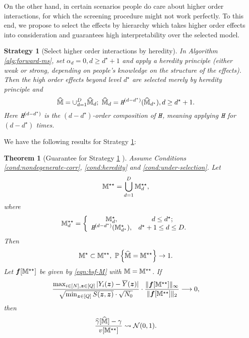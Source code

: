 \documentclass[12pt]{article}
\newtheorem{theorem}{Theorem}
\newtheorem{strategy}{Strategy}
\begin{document}
On the other hand, in certain scenarios people do care about higher order interactions, for which the screening procedure might not  work perfectly. To this end, we propose to select the effects by hierarchy which takes higher order effects into consideration and guarantees high interpretability over the selected model. 


\begin{strategy}[Select higher order interactions by heredity]\label{str:select-by-heredity}
In Algorithm \ref{alg:forward-ms}, set $\alpha_d = 0,d\ge d^\star+1$ and apply a heredity principle (either weak or strong, depending on people's knowledge on the structure of the effects). Then the high order effects beyond level $ d^\star$ are selected merely by heredity principle and 
$$
\widehat{{\mathbb{M}}} = \cup_{d=1}^{D}\widehat{{\mathbb{M}}}_{d}; ~\widehat{{\mathbb{M}}}_{d} = \texttt{\em H}^{(d-d^\star)}(\widehat{{\mathbb{M}}}_{d^\star}), d\ge d^\star+1.
$$
Here $\texttt{\em H}^{(d-d^\star)}$ is the $(d-d^\star)$-order composition of $\texttt{\em H}$, meaning applying $\texttt{\em H}$ for $(d-d^\star)$ times.
\end{strategy}


We have the following results for Strategy \ref{str:select-by-heredity}:
\begin{theorem}[Guarantee for Strategy \ref{str:select-by-heredity} ]\label{thm:strategy-II}
Assume Conditions \ref{cond:nondegenerate-corr}, \ref{cond:heredity} and \ref{cond:under-selection}. Let 
\begin{align*}
    {\mathbb{M}}^{\star\star} = \bigcup_{d=1}^D {\mathbb{M}}^{\star\star}_d,
\end{align*}
where
\begin{align*}
    {\mathbb{M}}^{\star\star}_d = \left\{
    \begin{array}{cc}
        {\mathbb{M}}^{\star}_d, & d\le d^\star; \\
        \texttt{\em H}^{(d-d^\star)}({\mathbb{M}}^{\star}_{d^\star}), & d^\star+1\le d\le D.
    \end{array}
    \right.
\end{align*}
Then 
\begin{align*}
    {\mathbb{M}}^\star \subset {\mathbb{M}}^{\star\star},~ {{\mathbb{P}}\left\{\widehat{{\mathbb{M}}} = {\mathbb{M}}^{\star\star}\right\}} \to 1.
\end{align*}
Let $ {{\boldsymbol{f}}}[{\mathbb{M}}^{\star\star}]$ be given by \eqref{eqn:bsf-M} with ${\mathbb{M}} = {\mathbb{M}}^{\star\star} $. If 
\begin{align*}
    \frac{\max_{i\in[N],{\boldsymbol{z}}\in[Q]}|Y_i({\boldsymbol{z}})-\overline{Y}({\boldsymbol{z}})|}{\sqrt{ \min_{{\boldsymbol{z}}\in[Q]} S({\boldsymbol{z}},{\boldsymbol{z}})}\cdot \sqrt{N_0}}\cdot  \frac{\|{{\boldsymbol{f}}}[{\mathbb{M}}^{\star\star}]\|_\infty}{\|{{\boldsymbol{f}}}[{\mathbb{M}}^{\star\star}]\|_2} \longrightarrow 0,
\end{align*}
then 
\begin{align*}
    \frac{{\widehat{\gamma}}[\widehat{{\mathbb{M}}}]-\gamma}{v[{\mathbb{M}}^{\star\star}]} \rightsquigarrow {\mathcal{N}}(0,1).
\end{align*}



\end{theorem}
\end{document}
